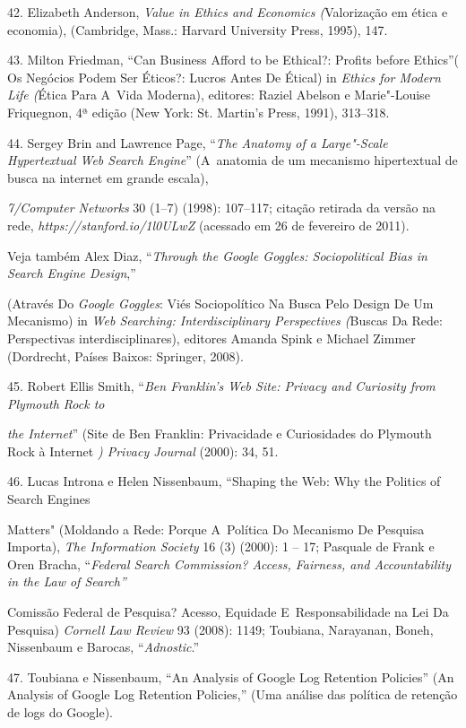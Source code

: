 \begin{Parskip}
42. Elizabeth Anderson, \emph{Value in Ethics and Economics (}Valorização
em ética e economia), (Cambridge, Mass.: Harvard University Press,
1995), 147.

43. Milton Friedman, ``Can Business Afford to be Ethical?: Profits before
Ethics''( Os Negócios Podem Ser Éticos?: Lucros Antes De Étical) in
\emph{Ethics for Modern Life (}Ética Para A~Vida Moderna), editores:
Raziel Abelson e Marie"-Louise Friquegnon, 4ª edição (New York: St.
Martin's Press, 1991), 313--318.

44. Sergey Brin and Lawrence Page, ``\emph{The Anatomy of a Large"-Scale
Hypertextual Web Search Engine}'' (A~anatomia de um mecanismo
hipertextual de busca na internet em grande escala),

\emph{7/Computer Networks} 30 (1--7) (1998): 107--117; citação
retirada da versão na rede,
\emph{https://stanford.io/1l0ULwZ}
(acessado em 26 de fevereiro de 2011).

Veja também Alex Diaz, ``\emph{Through} \emph{the Google Goggles:
Sociopolitical Bias in Search Engine Design},''

(Através Do \emph{Google Goggles}: Viés Sociopolítico Na Busca Pelo
Design De Um Mecanismo) in \emph{Web Searching: Interdisciplinary
Perspectives (}Buscas Da Rede: Perspectivas interdisciplinares),
editores Amanda Spink e Michael Zimmer (Dordrecht, Países Baixos:
Springer, 2008).

45. Robert Ellis Smith, ``\emph{Ben Franklin's Web Site: Privacy and
Curiosity from Plymouth Rock to}

\emph{the Internet}'' (Site de Ben Franklin: Privacidade e Curiosidades
do Plymouth Rock à Internet \emph{) Privacy Journal} (2000): 34, 51.

46. Lucas Introna e Helen Nissenbaum, ``Shaping the Web: Why the Politics
of Search Engines

Matters" (Moldando a Rede: Porque A~Política Do Mecanismo De Pesquisa
Importa), \emph{The Information Society} 16 (3) (2000): 1 -- 17;
Pasquale de Frank e Oren Bracha, ``\emph{Federal Search Commission?
Access, Fairness, and Accountability in the Law of Search''}

Comissão Federal de Pesquisa? Acesso, Equidade E~Responsabilidade na Lei
Da Pesquisa) \emph{Cornell Law Review} 93 (2008): 1149; Toubiana,
Narayanan, Boneh, Nissenbaum e Barocas, ``\emph{Adnostic}.''

47. Toubiana e Nissenbaum, ``An Analysis of Google Log Retention
Policies'' (An Analysis of Google Log Retention Policies,'' (Uma análise
das política de retenção de logs do Google).


\end{Parskip}
